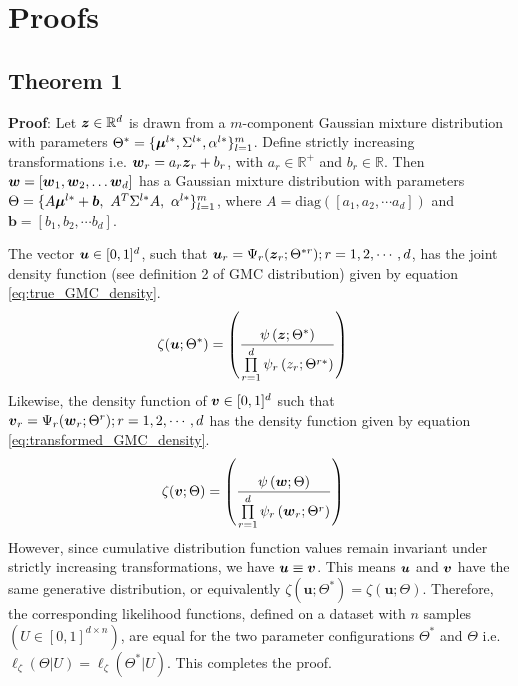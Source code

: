 \documentclass{article}
\theoremstyle{plain}
\theoremstyle{definition}
\theoremstyle{remark}
\begin{document}
\section{\textbf{Proofs}}\label{apd:Proofs}
\subsection{Theorem 1}\label{apd:Proof_theorem_1}
\textbf{Proof}:  Let $\boldsymbol{z}\in \mathbb{R}^d$ is drawn from a $m$-component Gaussian mixture distribution with parameters $\Theta^* = \{\boldsymbol{\mu}^{l*}, \Sigma^{l*}, \alpha^{l*}\}_{l=1}^m$. Define strictly increasing transformations i.e. $\boldsymbol{w}_r = a_r \boldsymbol{z}_r+b_r$, with $a_r \in \mathbb{R}^+$ and $b_r \in \mathbb{R}$. Then $\boldsymbol{w}= [\boldsymbol{w}_1, \boldsymbol{w}_2,\ldots \boldsymbol{w}_d]$  has a Gaussian mixture distribution with parameters  $\Theta= \{A\bs{\mu}^{l*}+\bs{b}, \ A^T\Sigma^{l*}A, \ \alpha^{l*}\}_{l=1}^m$, where $A = \text{diag}([a_1, a_2, \cdots a_d])$ and $\textbf{b}=[b_1, b_2, \cdots b_d]$.

The vector $\boldsymbol{u}\in [0,1]^d$, such that $\boldsymbol{u}_r = \Psi_r(\boldsymbol{z}_r;\Theta^{*r}); r=1,2,\cdots, d $, has the joint density function (see definition 2 of GMC distribution) given by equation \eqref{eq:true_GMC_density}.
\begin{align}\label{eq:true_GMC_density}
\zeta(\boldsymbol{u};\Theta^*) & = \left( \frac{\psi\left(\boldsymbol{z};\Theta^*\right)}{\prod\limits_{r=1}^{d}\psi_r\left(z_r;\Theta^{r*} \right)} \right)
\end{align}
Likewise, the density function of $\boldsymbol{v}\in [0,1]^d$ such that $\boldsymbol{v}_r = \Psi_r(\boldsymbol{w}_r;\Theta^r); r=1,2,\cdots, d $ has the density function given by equation \eqref{eq:transformed_GMC_density}.
\begin{align}\label{eq:transformed_GMC_density}
\zeta(\boldsymbol{v};\Theta) & = \left( \frac{\psi\left(\boldsymbol{w};\Theta\right)}{\prod\limits_{r=1}^{d}\psi_r\left(\boldsymbol{w}_r;\Theta^r \right)} \right)
\end{align}
However, since cumulative distribution function values remain invariant under strictly increasing transformations, we have $\boldsymbol{u} \equiv \boldsymbol{v}$. This means $\boldsymbol{u}$ and $\boldsymbol{v}$ have the same generative distribution, or equivalently $\zeta(\textbf{u};\Theta^*) = \zeta(\textbf{u};\Theta)$. Therefore, the corresponding likelihood functions, defined on a dataset with $n$ samples $(U \in [0 , 1]^{d\times n})$, are equal for the two parameter configurations $\Theta^*$ and $\Theta$ i.e. $\ell_\zeta(\Theta|U) = \ell_\zeta(\Theta^*|U)$. This completes the proof.
\end{document}
